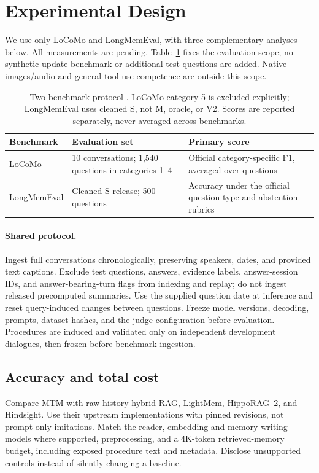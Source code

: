 \documentclass{article}
\newcommand{\method}{MTM}
\begin{document}
\FloatBarrier
\section{Experimental Design}
\label{sec:experiments}
We use only LoCoMo and LongMemEval, with three complementary analyses below.
All measurements are pending. Table~\ref{tab:benchmarks} fixes the evaluation
scope; no synthetic update benchmark or additional test questions are added.
Native images/audio and general tool-use competence are outside this scope.

\begin{table}[!ht]
\centering\small
\begin{tabularx}{\textwidth}{@{}lXX@{}}
\toprule
Benchmark & Evaluation set & Primary score \\
\midrule
LoCoMo & 10 conversations; 1,540 questions in categories 1--4 & Official category-specific F1, averaged over questions \\
LongMemEval & Cleaned S release; 500 questions & Accuracy under the official question-type and abstention rubrics \\
\bottomrule
\end{tabularx}
\caption{Two-benchmark protocol \citep{mrw_locomo,mrw_longmemeval}.
LoCoMo category 5 is excluded explicitly; LongMemEval uses cleaned S, not M,
oracle, or V2. Scores are reported separately, never averaged across benchmarks.}
\label{tab:benchmarks}
\end{table}

\paragraph{Shared protocol.}
Ingest full conversations chronologically, preserving speakers, dates, and
provided text captions. Exclude test questions, answers, evidence labels,
answer-session IDs, and answer-bearing-turn flags from indexing and replay;
do not ingest released precomputed summaries. Use the supplied question date
at inference and reset query-induced changes between questions. Freeze model
versions, decoding, prompts, dataset hashes, and the judge configuration
before evaluation. Procedures are induced and validated only on independent
development dialogues, then frozen before benchmark ingestion.

\subsection{Accuracy and total cost}
Compare \method{} with raw-history hybrid RAG, LightMem, HippoRAG~2, and
Hindsight. Use their upstream implementations with pinned revisions, not
prompt-only imitations. Match the reader, embedding and memory-writing models
where supported, preprocessing, and a 4K-token retrieved-memory budget,
including exposed procedure text and metadata. Disclose unsupported controls
instead of silently changing a baseline.
\end{document}
